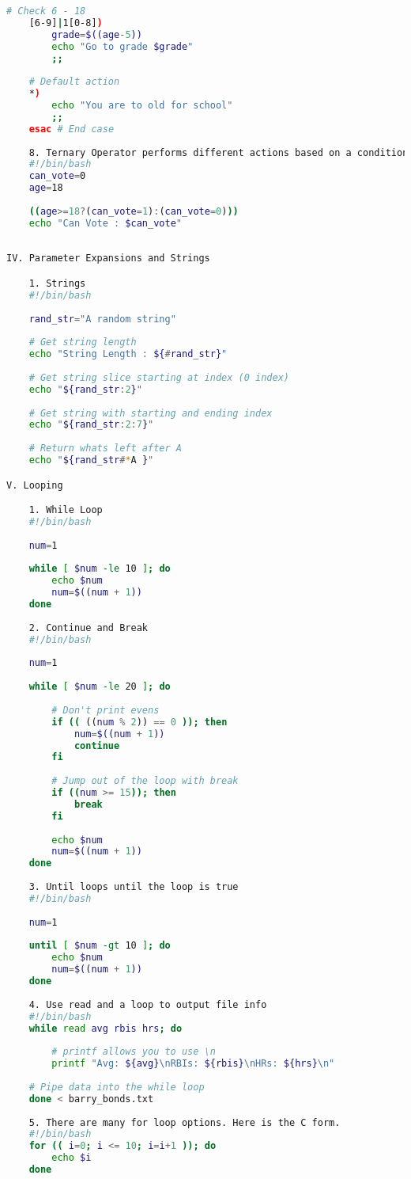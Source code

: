 \begin{lstlisting}[language=bash,caption={basics of bash}]
	# Check 6 - 18
	[6-9]|1[0-8])
		grade=$((age-5))
		echo "Go to grade $grade"
		;;
		
	# Default action
	*)
		echo "You are to old for school"
		;;
	esac # End case
	
	8. Ternary Operator performs different actions based on a condition
	#!/bin/bash
	can_vote=0
	age=18
	
	((age>=18?(can_vote=1):(can_vote=0)))
	echo "Can Vote : $can_vote"
	
	
IV. Parameter Expansions and Strings

	1. Strings
	#!/bin/bash
	
	rand_str="A random string"
	
	# Get string length
	echo "String Length : ${#rand_str}"
	
	# Get string slice starting at index (0 index)
	echo "${rand_str:2}"
	
	# Get string with starting and ending index
	echo "${rand_str:2:7}"
	
	# Return whats left after A
	echo "${rand_str#*A }"

V. Looping

	1. While Loop
	#!/bin/bash
	
	num=1
	
	while [ $num -le 10 ]; do
		echo $num
		num=$((num + 1))
	done
	
	2. Continue and Break
	#!/bin/bash
	
	num=1
	
	while [ $num -le 20 ]; do
	
		# Don't print evens
		if (( ((num % 2)) == 0 )); then
 			num=$((num + 1))
 			continue
 		fi
 		
 		# Jump out of the loop with break
 		if ((num >= 15)); then
 			break
 		fi
 		
		echo $num
		num=$((num + 1))
	done
	
	3. Until loops until the loop is true
	#!/bin/bash
	
	num=1
	
	until [ $num -gt 10 ]; do
		echo $num
		num=$((num + 1))
	done
	
	4. Use read and a loop to output file info
	#!/bin/bash
  	while read avg rbis hrs; do
  	
  		# printf allows you to use \n
  		printf "Avg: ${avg}\nRBIs: ${rbis}\nHRs: ${hrs}\n"
  		
  	# Pipe data into the while loop
  	done < barry_bonds.txt
  	
  	5. There are many for loop options. Here is the C form.
  	#!/bin/bash
  	for (( i=0; i <= 10; i=i+1 )); do
  		echo $i
  	done
  	

\end{lstlisting}
